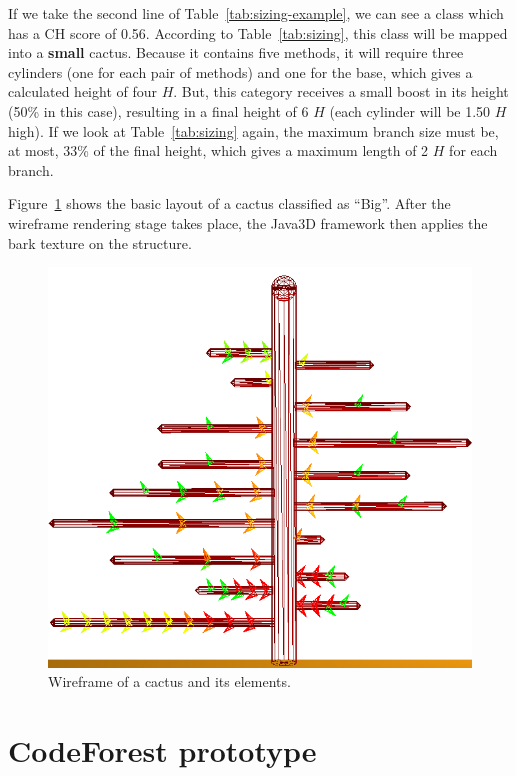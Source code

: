 If we take the second line of Table~\ref{tab:sizing-example}, we can see a class
which has a CH score of 0.56. According to Table~\ref{tab:sizing}, this class
will be mapped into a \textbf{small} cactus. Because it contains five methods,
it will require three cylinders (one for each pair of methods) and one for the
base, which gives a calculated height of four $H$. But, this category receives a
small boost in its height (50\% in this case), resulting in a final height of 6
$H$ (each cylinder will be 1.50 $H$ high). If we look at Table~\ref{tab:sizing}
again, the maximum branch size must be, at most, 33\% of the final height, which
gives a maximum length of 2 $H$ for each branch.

Figure~\ref{fig:wireframe} shows the basic layout of a cactus classified as
``Big''. After the wireframe rendering stage takes place, the Java3D framework
then applies the bark texture on the structure.

\begin{figure}
  \centering
    \includegraphics[width=\linewidth]{figures/wireframe}
  \caption{Wireframe of a cactus and its elements.}
  \label{fig:wireframe}
\end{figure}

\section{CodeForest prototype}

